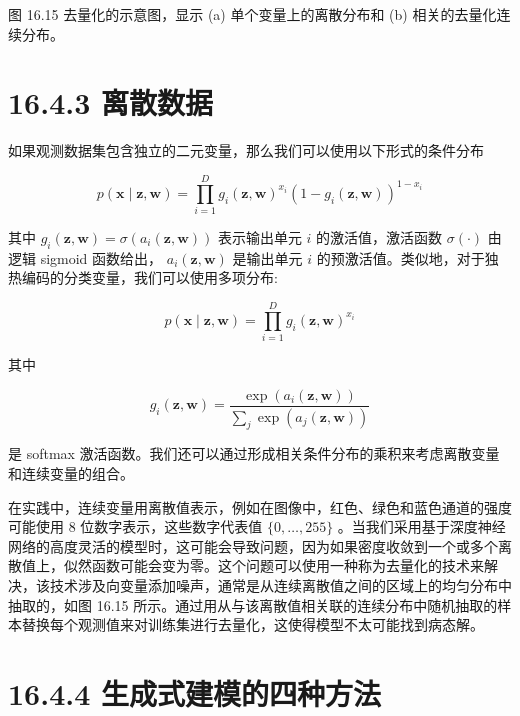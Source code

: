 \documentclass[10pt]{article}
\begin{document}
图 16.15 去量化的示意图，显示 (a) 单个变量上的离散分布和 (b) 相关的去量化连续分布。

\section*{16.4.3 离散数据}

如果观测数据集包含独立的二元变量，那么我们可以使用以下形式的条件分布

\[
p\left( {\mathbf{x} \mid  \mathbf{z},\mathbf{w}}\right)  = \mathop{\prod }\limits_{{i = 1}}^{D}{g}_{i}{\left( \mathbf{z},\mathbf{w}\right) }^{{x}_{i}}{\left( 1 - {g}_{i}\left( \mathbf{z},\mathbf{w}\right) \right) }^{1 - {x}_{i}} \tag{16.84}
\]

其中 \({g}_{i}\left( {\mathbf{z},\mathbf{w}}\right)  = \sigma \left( {{a}_{i}\left( {\mathbf{z},\mathbf{w}}\right) }\right)\) 表示输出单元 \(i\) 的激活值，激活函数 \(\sigma \left( \cdot \right)\) 由逻辑 sigmoid 函数给出， \({a}_{i}\left( {\mathbf{z},\mathbf{w}}\right)\) 是输出单元 \(i\) 的预激活值。类似地，对于独热编码的分类变量，我们可以使用多项分布:

\[
p\left( {\mathbf{x} \mid  \mathbf{z},\mathbf{w}}\right)  = \mathop{\prod }\limits_{{i = 1}}^{D}{g}_{i}{\left( \mathbf{z},\mathbf{w}\right) }^{{x}_{i}} \tag{16.85}
\]

其中

\[
{g}_{i}\left( {\mathbf{z},\mathbf{w}}\right)  = \frac{\exp \left( {{a}_{i}\left( {\mathbf{z},\mathbf{w}}\right) }\right) }{\mathop{\sum }\limits_{j}\exp \left( {{a}_{j}\left( {\mathbf{z},\mathbf{w}}\right) }\right) } \tag{16.86}
\]

是 softmax 激活函数。我们还可以通过形成相关条件分布的乘积来考虑离散变量和连续变量的组合。

在实践中，连续变量用离散值表示，例如在图像中，红色、绿色和蓝色通道的强度可能使用 8 位数字表示，这些数字代表值 \(\{ 0,\ldots ,{255}\}\) 。当我们采用基于深度神经网络的高度灵活的模型时，这可能会导致问题，因为如果密度收敛到一个或多个离散值上，似然函数可能会变为零。这个问题可以使用一种称为去量化的技术来解决，该技术涉及向变量添加噪声，通常是从连续离散值之间的区域上的均匀分布中抽取的，如图 16.15 所示。通过用从与该离散值相关联的连续分布中随机抽取的样本替换每个观测值来对训练集进行去量化，这使得模型不太可能找到病态解。

\section*{16.4.4 生成式建模的四种方法}
\end{document}
